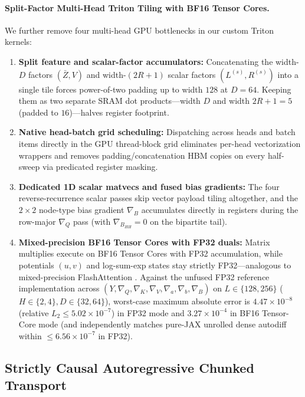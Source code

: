 \documentclass[11pt]{article}
\begin{document}
\paragraph{Split-Factor Multi-Head Triton Tiling with BF16 Tensor Cores.}
We further remove four multi-head GPU bottlenecks in our custom Triton kernels:
\begin{enumerate}[leftmargin=1.5em]
  \item \textbf{Split feature and scalar-factor accumulators:} Concatenating the width-$D$ factors $(\bar{Z}, V)$ and width-$(2R+1)$ scalar factors $(L^{(s)}, R^{(s)})$ into a single tile forces power-of-two padding up to width $128$ at $D=64$. Keeping them as two separate SRAM dot products---width $D$ and width $2R+1=5$ (padded to $16$)---halves register footprint.
  \item \textbf{Native head-batch grid scheduling:} Dispatching across heads and batch items directly in the GPU thread-block grid eliminates per-head vectorization wrappers and removes padding/concatenation HBM copies on every half-sweep via predicated register masking.
  \item \textbf{Dedicated 1D scalar matvecs and fused bias gradients:} The four reverse-recurrence scalar passes skip vector payload tiling altogether, and the $2\times 2$ node-type bias gradient $\nabla_B$ accumulates directly in registers during the row-major $\nabla_Q$ pass (with $\nabla_{B_{HH}} = 0$ on the bipartite tail).
  \item \textbf{Mixed-precision BF16 Tensor Cores with FP32 duals:} Matrix multiplies execute on BF16 Tensor Cores with FP32 accumulation, while potentials $(u, v)$ and log-sum-exp states stay strictly FP32---analogous to mixed-precision FlashAttention \citep{dao2023flashattention2,shah2024flashattention3}. Against the unfused FP32 reference implementation across $(Y, \nabla_Q, \nabla_K, \nabla_V, \nabla_a, \nabla_b, \nabla_B)$ on $L \in \{128, 256\}$ ($H \in \{2,4\}, D \in \{32,64\}$), worst-case maximum absolute error is $4.47\times 10^{-8}$ (relative $L_2 \le 5.02\times 10^{-7}$) in FP32 mode and $3.27\times 10^{-4}$ in BF16 Tensor-Core mode (and independently matches pure-JAX unrolled dense autodiff within $\le 6.56\times 10^{-7}$ in FP32).
\end{enumerate}

\subsection{Strictly Causal Autoregressive Chunked Transport}
\label{sec:causal}
\end{document}
